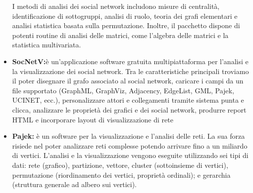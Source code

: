 \documentclass[binding=0.6cm]{sapthesis}
\begin{document}
\begin{itemize}
  I metodi di analisi dei social network includono misure di centralità, identificazione di sottogruppi, analisi di ruolo, teoria dei grafi elementari e analisi statistica basata sulla permutazione. 
  Inoltre, il pacchetto dispone di potenti routine di analisi delle matrici, come l'algebra delle matrici e la statistica multivariata.
  \item \textbf{SocNetV\cite{SocNetV2024}:}è un'applicazione software gratuita multipiattaforma per l'analisi e la visualizzazione dei social network.
  Tra le caratteristiche principali troviamo il poter disegnare il grafo associato al social network, caricare i campi da un file supportato
  (GraphML, GraphViz, Adjacency, EdgeList, GML, Pajek, UCINET, ecc.), personalizzare attori e collegamenti tramite sistema punta e clicca,
  analizzare le proprietà dei grafici e dei social network, produrre report HTML e incorporare layout di visualizzazione di rete
  \item \textbf{Pajek\cite{Pajek2024}:}  è un software per la visualizzazione e l'analisi delle reti. La sua forza risiede nel poter analizzare reti complesse potendo arrivare
  fino a un miliardo di vertici. L'analisi e la visualizzazione vengono eseguite utilizzando sei tipi di dati: 
  rete (grafico), partizione, vettore, cluster (sottoinsieme di vertici), permutazione (riordinamento dei vertici, proprietà ordinali); e gerarchia (struttura generale ad albero sui vertici).
\end{itemize}
\end{document}
